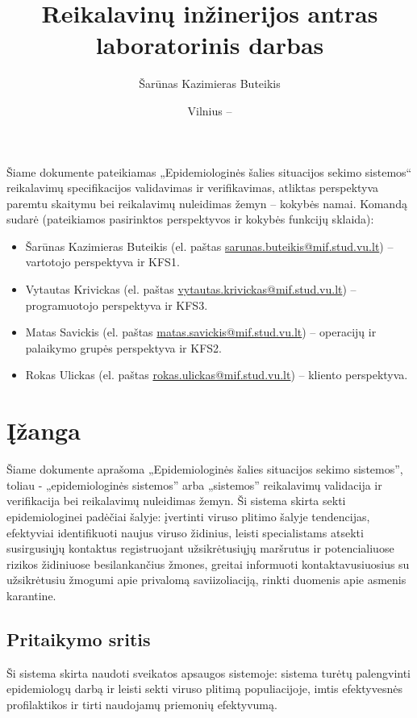 \documentclass{VUMIFPSkursinis}
\title{Reikalavinų inžinerijos antras laboratorinis darbas}
\author{Šarūnas Kazimieras Buteikis}
\date{Vilnius – \the\year}
\begin{document}
\maketitle


Šiame dokumente pateikiamas „Epidemiologinės šalies situacijos sekimo sistemos“ reikalavimų specifikacijos validavimas ir verifikavimas, atliktas
perspektyva paremtu skaitymu bei reikalavimų nuleidimas žemyn -- kokybės namai. Komandą sudarė (pateikiamos pasirinktos perspektyvos ir kokybės funkcijų sklaida):
\begin{itemize}
	\item Šarūnas Kazimieras Buteikis (el. paštas \href{mailto:sarunas.buteikis@mif.stud.vu.lt}{sarunas.buteikis@mif.stud.vu.lt}) -- vartotojo perspektyva ir KFS1.
	\item Vytautas Krivickas (el. paštas \href{mailto:vytautas.krivickas@mif.stud.vu.lt}{vytautas.krivickas@mif.stud.vu.lt}) -- programuotojo perspektyva ir KFS3.
	\item Matas Savickis (el. paštas \href{mailto:matas.savickis@mif.stud.vu.lt}{matas.savickis@mif.stud.vu.lt}) -- operacijų ir palaikymo grupės perspektyva ir KFS2.
	\item Rokas Ulickas (el. paštas \href{mailto:rokas.ulickas@mif.stud.vu.lt}{rokas.ulickas@mif.stud.vu.lt}) -- kliento perspektyva.
\end{itemize}

\newpage

\tableofcontents


\section{Įžanga}

Šiame dokumente aprašoma „Epidemiologinės šalies situacijos sekimo sistemos”, toliau - „epidemiologinės sistemos” arba „sistemos”
reikalavimų validacija ir verifikacija bei reikalavimų nuleidimas žemyn.
Ši sistema skirta sekti epidemiologinei padėčiai šalyje: įvertinti viruso plitimo šalyje tendencijas,
efektyviai identifikuoti naujus viruso židinius, leisti specialistams atsekti susirgusiųjų
kontaktus registruojant užsikrėtusiųjų maršrutus ir potencialiuose rizikos židiniuose
besilankančius žmones, greitai informuoti kontaktavusiuosius su užsikrėtusiu žmogumi
apie privalomą saviizoliaciją, rinkti duomenis apie asmenis karantine.

\subsection{Pritaikymo sritis}
Ši sistema skirta naudoti sveikatos apsaugos sistemoje: sistema turėtų palengvinti
epidemiologų darbą ir leisti sekti viruso plitimą populiacijoje, imtis efektyvesnės
profilaktikos ir tirti naudojamų priemonių efektyvumą.
\end{document}
